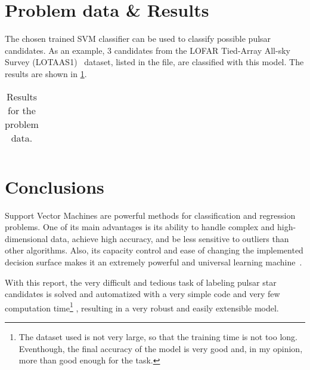 \section{Problem data \& Results}
The chosen trained SVM classifier can be used to classify possible pulsar
candidates.
As an example, 3 candidates from the LOFAR Tied-Array All-sky Survey 
(LOTAAS1)~\cite{vanderwateren2023lofar} dataset, listed in the
 file,
are classified with this model.
The results are shown in \cref{tab:results}.

\begin{table}[b!]
    \caption{Results for the problem data.}
    \label{tab:results}
    \centering
    \begin{tabular}{@{}c c c c c c c c c@{}}
        \toprule
        
        \midrule

        

        \bottomrule
    \end{tabular}
\end{table}

\section{Conclusions}
Support Vector Machines are powerful methods for classification and regression problems.
One of its main advantages is its ability to handle complex and high-dimensional
data, achieve high accuracy, and be less sensitive to outliers than other
algorithms.
Also, its capacity control and ease of changing the implemented decision
surface makes it an extremely powerful and universal learning 
machine~\cite{cortes1995supportvector}.

With this report, the very difficult and tedious task of labeling pulsar star
candidates is solved and automatized with a very simple code and very few computation
time\footnote{The dataset used is not very large, so that the training time is
    not too long. Eventhough, the final accuracy of the model is very good and,
    in my opinion, more than good enough for the task.}
, resulting in a very robust and easily extensible model.
